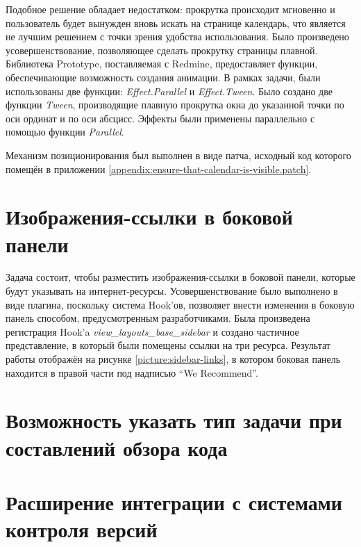 Подобное решение обладает недостатком: прокрутка происходит мгновенно и
пользователь будет вынужден вновь искать на странице календарь, что является не
лучшим решением с точки зрения удобства использования. Было произведено
усовершенствование, позволяющее сделать прокрутку страницы плавной.
Библиотека Prototype, поставляемая с Redmine, предоставляет функции,
обеспечивающие возможность создания анимации. В рамках задачи, были
использованы две функции: \textit{Effect.Parallel} и \textit{Effect.Tween}.
Было создано две функции \textit{Tween}, производящие плавную прокрутка окна до
указанной точки по оси ординат и по оси абсцисс. Эффекты были применены
параллельно с помощью функции \textit{Parallel}.

Механизм позиционирования был выполнен в виде патча, исходный код
которого помещён в приложении
\ref{appendix:ensure-that-calendar-is-visible.patch}.

\section{Изображения-ссылки в боковой панели}
Задача состоит, чтобы разместить изображения-ссылки в боковой панели, которые
будут указывать на интернет-ресурсы. Усовершенствование было выполнено в виде плагина, поскольку система Hook'ов,
позволяет внести изменения в боковую панель способом, предусмотренным
разработчиками. Была произведена регистрация Hook'a
\textit{view\_layouts\_base\_sidebar} и создано частичное представление, в
который были помещены ссылки на три ресурса. Результат работы отображён на
рисунке \ref{picture:sidebar-links}, в котором боковая панель находится в
правой части под надписью ``We Recommend''.


\section{Возможность указать тип задачи при составлений обзора кода}

\section{Расширение интеграции с системами контроля версий}



